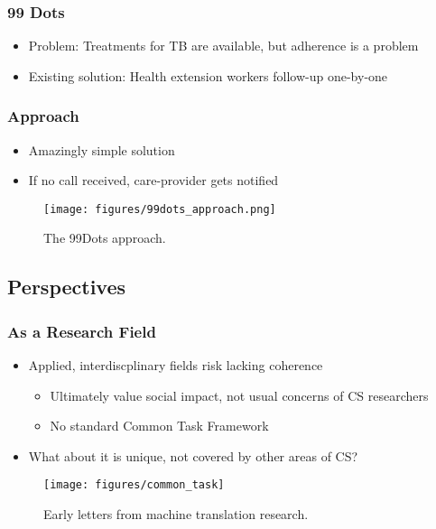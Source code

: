 \documentclass[10pt,mathserif]{beamer}
\begin{document}
\begin{frame}
  \frametitle{99 Dots}
  \begin{itemize}
  \item Problem: Treatments for TB are available, but adherence is a problem
  \item Existing solution: Health extension workers follow-up one-by-one
  \end{itemize}
\end{frame}

\begin{frame}
  \frametitle{Approach}
  \begin{itemize}
  \item Amazingly simple solution
  \item If no call received, care-provider gets notified
  \end{itemize}
  \begin{figure}[ht]
    \centering
    \texttt{[image: figures/99dots\_approach.png]}
    \caption{The 99Dots approach. \label{fig:label} }
  \end{figure}
\end{frame}

\subsection{Perspectives}

\begin{frame}
  \frametitle{As a Research Field}
  \begin{itemize}
  \item Applied, interdiscplinary fields risk lacking coherence
    \begin{itemize}
    \item Ultimately value social impact, not usual concerns of CS researchers
    \item No standard Common Task Framework
    \end{itemize}
  \item What about it is unique, not covered by other areas of CS?
  \end{itemize}
  \begin{figure}[ht]
    \centering
    \texttt{[image: figures/common\_task]}
    \caption{Early letters from machine translation research. \label{fig:label} }
  \end{figure}
\end{frame}
\end{document}
